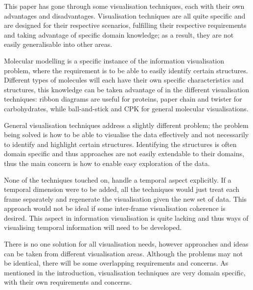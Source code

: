 
This paper has gone through some visualisation techniques, each with their own
advantages and disadvantages. Visualisation techniques are all quite specific
and are designed for their respective scenarios, fulfilling their respective
requirements and taking advantage of specific domain knowledge; as a result,
they are not easily generalisable into other areas.

Molecular modelling is a specific instance of the information visualisation
problem, where the requirement is to be able to easily identify certain
structures. Different types of molecules will each have their own specific
characteristics and structures, this knowledge can be taken advantage of in the
different visualisation techniques: ribbon diagrams are useful for proteins,
paper chain and twister for carbohydrates, while ball-and-stick and CPK for
general molecular visualisations.

General visualisation techniques address a slightly different problem; the
problem being solved is how to be able to visualise the data effectively and
not necessarily to identify and highlight certain structures. Identifying the
structures is often domain specific and thus approaches are not easily
extendable to their domains, thus the main concern is how to enable easy
exploration of the data.

None of the techniques touched on, handle a temporal aspect explicitly. If a
temporal dimension were to be added, all the techniques would just treat each
frame separately and regenerate the visualisation given the new set of data.
This approach would not be ideal if some inter-frame visualisation coherence is
desired. This aspect in information visualisation is quite lacking and thus ways
of visualising temporal information will need to be developed.

There is no one solution for all visualisation needs, however approaches and
ideas can be taken from different visualisation areas. Although the problems
may not be identical, there will be some overlapping requirements and concerns.
As mentioned in the introduction, visualisation techniques are very domain
specific, with their own requirements and concerns.


